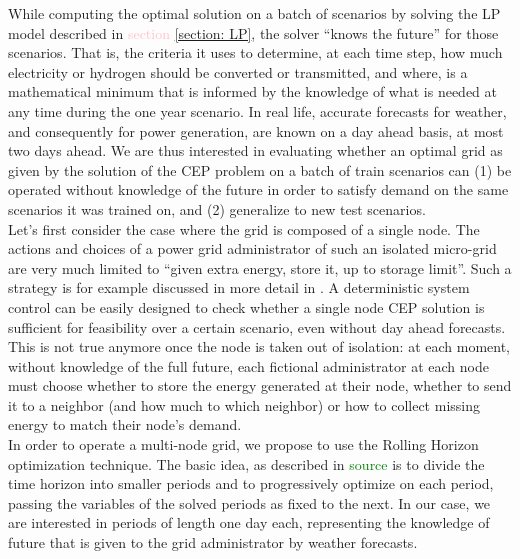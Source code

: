 While computing the optimal solution on a batch of scenarios by solving the LP model described in \textcolor{pink}{section} \ref{section: LP}, the solver ``knows the future'' for those scenarios. That is, the criteria it uses to determine, at each time step, how much electricity or hydrogen should be converted or transmitted, and where, is a mathematical minimum that is informed by the knowledge of what is needed at any time during the one year scenario.
In real life, accurate forecasts for weather, and consequently for power generation, are known on a day ahead basis, at most two days ahead. We are thus interested in evaluating whether an optimal grid as given by the solution of the CEP problem on a batch of train scenarios can (1) be operated without knowledge of the future in order to satisfy demand on the same scenarios it was trained on, and (2) generalize to new test scenarios.\\

\indent Let's first consider the case where the grid is composed of a single node. The actions and choices of a power grid administrator of such an isolated micro-grid are very much limited to ``given extra energy, store it, up to storage limit''. Such a strategy is for example discussed in more detail in \textcolor{green}{\cite{deterministic}}. A deterministic system control can be easily designed to check whether a single node CEP solution is sufficient for feasibility over a certain scenario, even without day ahead forecasts.
This is not true anymore once the node is taken out of isolation: at each moment, without knowledge of the full future, each fictional administrator at each node must choose whether to store the energy generated at their node, whether to send it to a neighbor (and how much to which neighbor) or how to collect missing energy to match their node's demand.\\

\indent In order to operate a multi-node grid, we propose to use the Rolling Horizon optimization technique. 
The basic idea, as described in \textcolor{green}{source} is to divide the time horizon into smaller periods and to progressively optimize on each period, passing the variables of the solved periods as fixed to the next. In our case, we are interested in periods of length one day each, representing the knowledge of future that is given to the grid administrator by weather forecasts.  \\

